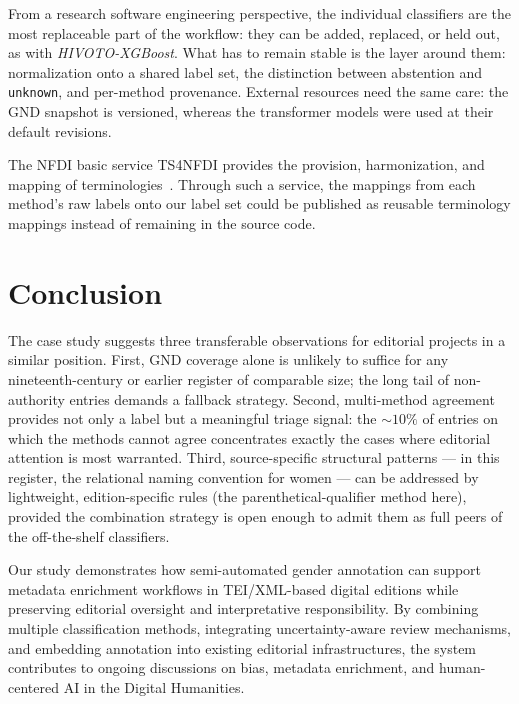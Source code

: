 \documentclass{eceasst}
\begin{document}
From a research software engineering perspective, the individual classifiers are the most replaceable part of the workflow: they can be added, replaced, or held out, as with \textit{HIVOTO-XGBoost}. What has to remain stable is the layer around them: normalization onto a shared label set, the distinction between abstention and \texttt{unknown}, and per-method provenance. External resources need the same care: the GND snapshot is versioned, whereas the transformer models were used at their default revisions.

The NFDI basic service TS4NFDI provides the provision, harmonization, and mapping of terminologies~\cite{baum_technical_2025}. Through such a service, the mappings from each method's raw labels onto our label set could be published as reusable terminology mappings instead of remaining in the source code.

\section{Conclusion}
\label{sec:conclusion}

The case study suggests three transferable observations for editorial projects in a similar position. First, GND coverage alone is unlikely to suffice for any nineteenth-century or earlier register of comparable size; the long tail of non-authority entries demands a fallback strategy. Second, multi-method agreement provides not only a label but a meaningful triage signal: the $\sim$$10\%$ of entries on which the methods cannot agree concentrates exactly the cases where editorial attention is most warranted. Third, source-specific structural patterns --- in this register, the relational naming convention for women --- can be addressed by lightweight, edition-specific rules (the parenthetical-qualifier method here), provided the combination strategy is open enough to admit them as full peers of the off-the-shelf classifiers.

Our study demonstrates how semi-automated gender annotation can support metadata enrichment workflows in TEI/XML-based digital editions while preserving editorial oversight and interpretative responsibility. By combining multiple classification methods, integrating uncertainty-aware review mechanisms, and embedding annotation into existing editorial infrastructures, the system contributes to ongoing discussions on bias, metadata enrichment, and human-centered AI in the Digital Humanities.
\end{document}
